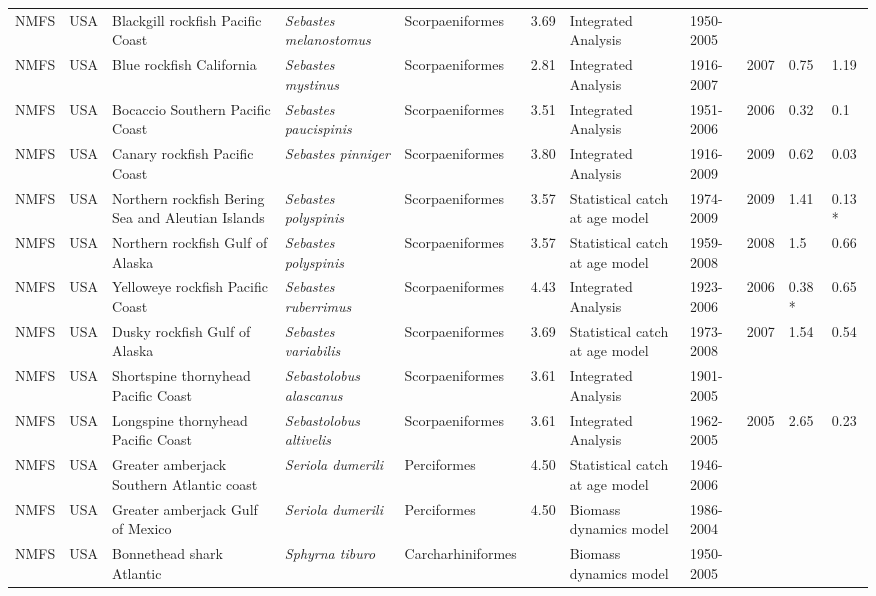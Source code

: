 \begin{longtable}{p{1.5cm}p{1.5cm}p{3cm}p{3cm}p{2.5cm}p{0.9cm}p{1.4cm}p{0.9cm}p{0.9cm}p{0.9cm}p{1cm}}
  NMFS & USA & Blackgill rockfish  Pacific Coast & \textit{Sebastes melanostomus} & Scorpaeniformes & 3.69 & Integrated Analysis & 1950-2005 &  &  &  \\ 
  NMFS & USA & Blue rockfish California & \textit{Sebastes mystinus} & Scorpaeniformes & 2.81 & Integrated Analysis & 1916-2007 & 2007 & 0.75 & 1.19 \\ 
  NMFS & USA & Bocaccio Southern Pacific Coast & \textit{Sebastes paucispinis} & Scorpaeniformes & 3.51 & Integrated Analysis & 1951-2006 & 2006 & 0.32 & 0.1 \\ 
  NMFS & USA & Canary rockfish Pacific Coast & \textit{Sebastes pinniger} & Scorpaeniformes & 3.80 & Integrated Analysis & 1916-2009 & 2009 & 0.62 & 0.03 \\ 
  NMFS & USA & Northern rockfish Bering Sea and Aleutian Islands & \textit{Sebastes polyspinis} & Scorpaeniformes & 3.57 & Statistical catch at age model & 1974-2009 & 2009 & 1.41 & 0.13 * \\ 
  NMFS & USA & Northern rockfish Gulf of Alaska & \textit{Sebastes polyspinis} & Scorpaeniformes & 3.57 & Statistical catch at age model & 1959-2008 & 2008 & 1.5 & 0.66 \\ 
  NMFS & USA & Yelloweye rockfish Pacific Coast & \textit{Sebastes ruberrimus} & Scorpaeniformes & 4.43 & Integrated Analysis & 1923-2006 & 2006 & 0.38 * & 0.65 \\ 
  NMFS & USA & Dusky rockfish Gulf of Alaska & \textit{Sebastes variabilis} & Scorpaeniformes & 3.69 & Statistical catch at age model & 1973-2008 & 2007 & 1.54 & 0.54 \\ 
  NMFS & USA & Shortspine thornyhead Pacific Coast & \textit{Sebastolobus alascanus} & Scorpaeniformes & 3.61 & Integrated Analysis & 1901-2005 &  &  &  \\ 
  NMFS & USA & Longspine thornyhead Pacific Coast & \textit{Sebastolobus altivelis} & Scorpaeniformes & 3.61 & Integrated Analysis & 1962-2005 & 2005 & 2.65 & 0.23 \\ 
  NMFS & USA & Greater amberjack Southern Atlantic coast & \textit{Seriola dumerili} & Perciformes & 4.50 & Statistical catch at age model & 1946-2006 &  &  &  \\ 
  NMFS & USA & Greater amberjack Gulf of Mexico & \textit{Seriola dumerili} & Perciformes & 4.50 & Biomass dynamics model & 1986-2004 &  &  &  \\ 
  NMFS & USA & Bonnethead shark Atlantic & \textit{Sphyrna tiburo} & Carcharhiniformes &  & Biomass dynamics model & 1950-2005 &  &  &  \\ 

\end{longtable}
